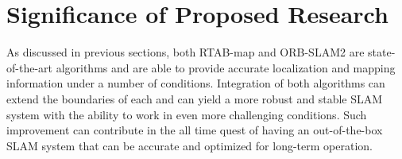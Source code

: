 \documentclass[12pt]{article}
\begin{document}
\section{Significance of Proposed Research}
As discussed in previous sections, both RTAB-map and ORB-SLAM2 are state-of-the-art algorithms and are able to provide accurate localization and mapping information under a number of conditions. Integration of both algorithms can extend the boundaries of each and can yield a more robust and stable SLAM system with the ability to work in even more challenging conditions. Such improvement can contribute in the all time quest of having an out-of-the-box SLAM system \cite{cadena2016past} that can be accurate and optimized for long-term operation.

\newpage


 
\end{document}
